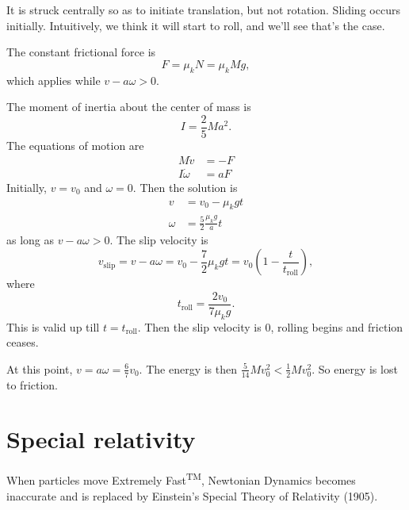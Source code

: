 \documentclass[a4paper]{article}
\begin{document}
\begin{eg}\leavevmode
  \begin{center}
  \end{center}
  It is struck centrally so as to initiate translation, but not rotation. Sliding occurs initially. Intuitively, we think it will start to roll, and we'll see that's the case.

  The constant frictional force is
  \[
    F = \mu_k N = \mu_k Mg,
  \]
  which applies while $v - a\omega > 0$.

  The moment of inertia about the center of mass is
  \[
    I = \frac{2}{5}Ma^2.
  \]
  The equations of motion are
  \begin{align*}
    M\dot{v} &= -F\\
    I\dot\omega &= aF
  \end{align*}
  Initially, $v = v_0$ and $\omega = 0$. Then the solution is
  \begin{align*}
    v &= v_0 - \mu_k gt\\
    \omega &= \frac{5}{2} \frac{\mu_k g}{a}t
  \end{align*}
  as long as $v - a \omega > 0$. The slip velocity is
  \[
    v_{\mathrm{slip}} = v - a\omega = v_0 - \frac{7}{2}\mu_k gt = v_0 \left(1 - \frac{t}{t_\mathrm{roll}}\right),
  \]
  where
  \[
    t_{\mathrm{roll}} = \frac{2v_0}{7\mu_k g}.
  \]
  This is valid up till $t = t_{\mathrm{roll}}$. Then the slip velocity is 0, rolling begins and friction ceases.

  At this point, $v = a\omega = \frac{6}{7}v_0$. The energy is then $\frac{5}{14}Mv_0^2 < \frac{1}{2}Mv_0^2$. So energy is lost to friction.
\end{eg}
\section{Special relativity}
When particles move Extremely Fast\textsuperscript{TM}, Newtonian Dynamics becomes inaccurate and is replaced by Einstein's Special Theory of Relativity (1905).
\end{document}

